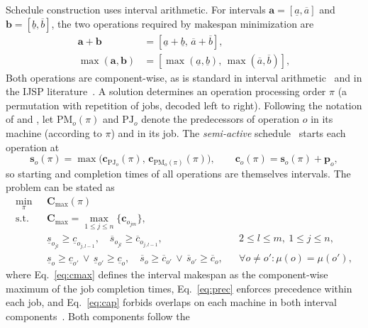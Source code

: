 \documentclass[preprint,number,sort&compress,12pt]{elsarticle}
\begin{document}
Schedule construction uses interval arithmetic. For intervals
$\mathbf{a}=[\underline{a},\overline{a}]$ and
$\mathbf{b}=[\underline{b},\overline{b}]$,
the two operations required by makespan minimization are
\begin{align}
\mathbf{a} + \mathbf{b} &= [\underline{a}+\underline{b},\,
\overline{a}+\overline{b}],\\
\max(\mathbf{a},\mathbf{b}) &= [\max(\underline{a},\underline{b}),\,
\max(\overline{a},\overline{b})],
\end{align}
Both operations are component-wise, as is standard in interval
arithmetic~\citep{Moore2009} and in the IJSP
literature~\citep{DiazGA2020}. A solution determines an operation
processing order $\pi$ (a permutation with repetition of jobs, decoded
left to right). Following the notation of \citet{DiazGA2020} and
\citet{DiazICAE2023},
let $\mathrm{PM}_o(\pi)$ and $\mathrm{PJ}_o$ denote the predecessors of operation $o$ in its
machine (according to $\pi$) and in its job. The \emph{semi-active}
schedule~\citep{Sprecher1995} starts each operation at
\begin{equation}
\mathbf{s}_o(\pi) = \max\big(\mathbf{c}_{\mathrm{PJ}_o}(\pi),\,
\mathbf{c}_{\mathrm{PM}_o(\pi)}(\pi)\big), \qquad
\mathbf{c}_o(\pi) = \mathbf{s}_o(\pi) + \mathbf{p}_o,
\label{eq:sgs}
\end{equation}
so starting and completion times of all operations are themselves intervals.
The problem can be stated as
\begin{align}
\min_{\pi}\; & \mathbf{C}_{\max}(\pi) \label{eq:obj}\\
\text{s.t.}\quad
& \mathbf{C}_{\max} = \max_{1 \le j \le n} \{\mathbf{c}_{o_{jm}}\},
  \label{eq:cmax}\\
& \underline{s}_{o_{jl}} \ge \underline{c}_{o_{j,l-1}}, \quad
  \overline{s}_{o_{jl}} \ge \overline{c}_{o_{j,l-1}},
  && 2 \le l \le m,\ 1 \le j \le n, \label{eq:prec}\\
& \underline{s}_o \ge \underline{c}_{o'} \,\vee\,
  \underline{s}_{o'} \ge \underline{c}_o, \quad
  \overline{s}_o \ge \overline{c}_{o'} \,\vee\,
  \overline{s}_{o'} \ge \overline{c}_o,
  && \forall o \ne o': \mu(o) = \mu(o'), \label{eq:cap}
\end{align}
where Eq.~\eqref{eq:cmax} defines the interval makespan as the
component-wise maximum of the job completion times,
Eq.~\eqref{eq:prec} enforces precedence within each job, and
Eq.~\eqref{eq:cap} forbids overlaps on each machine in both interval
components~\citep{DiazGA2020,DiazICAE2023}. Both components follow the
\end{document}
